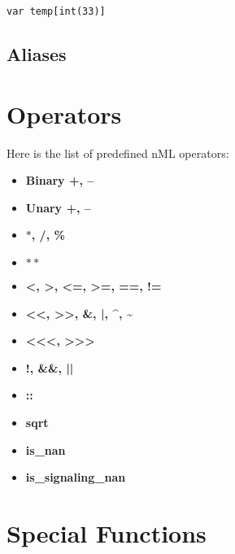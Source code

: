 \begin{lstlisting}
var temp[int(33)]
\end{lstlisting}


\subsection{Aliases}



\section{Operators}

Here is the list of predefined nML operators:

\begin{itemize}

\item \textbf{Binary +, --}

\item \textbf{Unary +, --}

\item \textbf{$\ast$, /, \%}

\item \textbf{$\ast\ast$}

\item \textbf{<, >, <=, >=, ==, !=}

\item \textbf{{<}{<}, {>}{>}, \&, |, \^{}, \~{}}

\item \textbf{{<}{<}{<}, {>}{>}{>}}

\item \textbf{!, \&\&, ||}

\item \textbf{::}

\item \textbf{sqrt}

\item \textbf{is{\_}nan}

\item \textbf{is{\_}signaling{\_}nan}

\end{itemize}


\section{Special Functions}

